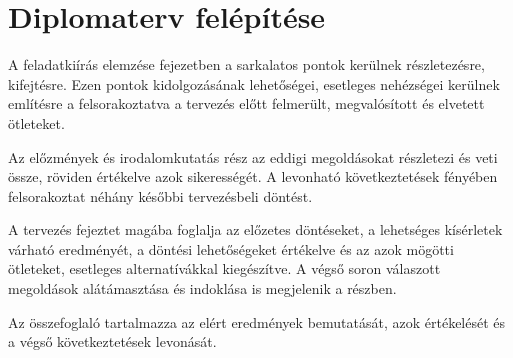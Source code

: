 \section{Diplomaterv felépítése}

A feladatkiírás elemzése fejezetben a sarkalatos pontok kerülnek részletezésre, kifejtésre. Ezen pontok kidolgozásának lehetőségei, esetleges nehézségei kerülnek említésre a felsorakoztatva a tervezés előtt felmerült, megvalósított és elvetett ötleteket.

Az előzmények és irodalomkutatás rész az eddigi megoldásokat részletezi és veti össze, röviden értékelve azok sikerességét. A levonható következtetések fényében felsorakoztat néhány későbbi tervezésbeli döntést.

A tervezés fejeztet magába foglalja az előzetes döntéseket, a lehetséges kísérletek várható eredményét, a döntési lehetőségeket értékelve és az azok mögötti ötleteket, esetleges alternatívákkal kiegészítve. A végső soron válaszott megoldások alátámasztása és indoklása is megjelenik a részben.

Az összefoglaló tartalmazza az elért eredmények bemutatását, azok értékelését és a végső következtetések levonását.